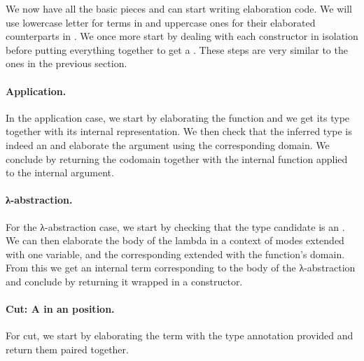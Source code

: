 \noindent
\begin{minipage}{\textwidth}
\begin{minipage}[t]{0.5\textwidth}
\end{minipage}
\begin{minipage}[t]{0.45\textwidth}
\end{minipage}
\end{minipage}

We now have all the basic pieces and can start writing elaboration code. We
will use lowercase letter for terms in  and uppercase ones for their
elaborated counterparts in . We once more start by dealing with each
constructor in isolation before putting everything together to get a
. These steps are very similar to the ones in the previous
section.

\paragraph*{Application.} In the application case, we start by elaborating the
function and we get its type together with its internal representation. We then
check that the inferred type is indeed an  and elaborate the argument
using the corresponding domain. We conclude by returning the codomain together
with the internal function applied to the internal argument.
\begin{agdasnippet}
\end{agdasnippet}
\paragraph*{λ-abstraction.} For the λ-abstraction case, we start by
checking that the type candidate  is an . We can
then elaborate the body  of the lambda in a context of modes extended
with one  variable, and the corresponding  extended
with the function's domain. From this we get
an internal term  corresponding to the body of the λ-abstraction and
conclude by returning it wrapped in a  constructor.
\begin{agdasnippet}
\end{agdasnippet}
\paragraph*{Cut: A  in an  position.} For cut, we start by
elaborating the term with the type annotation provided and return them paired
together.
\begin{agdasnippet}
\end{agdasnippet}

